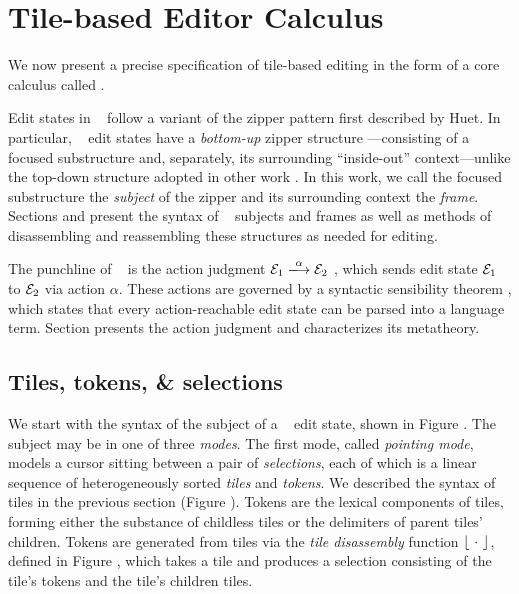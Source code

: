
\section{Tile-based Editor Calculus}\label{sec:formalism}

We now present a precise specification of tile-based
editing in the form of a core calculus called \ty.

Edit states in \ty~ follow a variant
of the zipper pattern first described by Huet.
In particular, \ty~ edit states have a \emph{bottom-up}
zipper structure ---consisting of a focused substructure
and, separately, its surrounding ``inside-out'' context---unlike
the top-down structure adopted in other work .
In this work, we call the focused substructure the \emph{subject} of
the zipper and its surrounding context the \emph{frame}.
Sections  and  present the syntax of
\ty~ subjects and frames as well as methods of disassembling
and reassembling these structures as needed for editing.

The punchline of \ty~ is the action judgment
$\performAction{\editState_1}{\action}{\editState_2}$ ,
which sends edit state $\mathcal{E}_1$ to $\mathcal{E}_2$
via action $\alpha$.
These actions are governed by a syntactic sensibility theorem ,
which states that every action-reachable edit state can
be parsed into a language term.
Section  presents the action judgment and characterizes
its metatheory.

\subsection{Tiles, tokens, \& selections}
We start with the syntax of the subject of a \ty~ edit state,
shown in Figure .
The subject may be in one of three \emph{modes}.
The first mode, called \emph{pointing mode}, models
a cursor sitting between a pair of \emph{selections},
each of which is a linear sequence of heterogeneously
sorted \emph{tiles} and \emph{tokens}.
We described the syntax of tiles
in the previous section (Figure ).
Tokens are the lexical components of tiles, forming either
the substance of childless tiles or the delimiters of parent
tiles' children.
Tokens are generated from tiles via the \emph{tile disassembly} function
$\left\lfloor~\cdot~\right\rfloor$, defined in Figure ,
which takes a tile and produces
a selection consisting of the tile's tokens
and the tile's children tiles.

